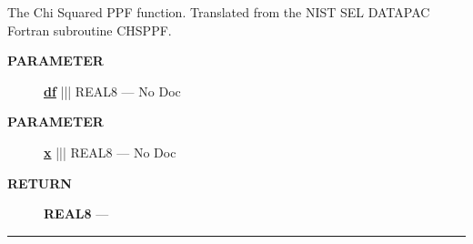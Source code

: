 The Chi Squared PPF function. Translated from the NIST SEL DATAPAC Fortran subroutine CHSPPF.






\par
\begin{description}
\item [\colorbox{tagtype}{\color{white} \textbf{\textsf{PARAMETER}}}] \textbf{\underline{df}} ||| REAL8 --- No Doc
\item [\colorbox{tagtype}{\color{white} \textbf{\textsf{PARAMETER}}}] \textbf{\underline{x}} ||| REAL8 --- No Doc
\end{description}







\par
\begin{description}
\item [\colorbox{tagtype}{\color{white} \textbf{\textsf{RETURN}}}] \textbf{REAL8} --- 
\end{description}




\rule{\linewidth}{0.5pt}



